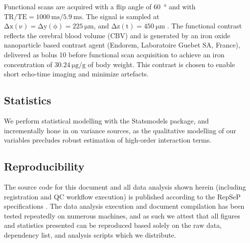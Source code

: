 Functional scans are acquired with a flip angle of \SI{60}{\degree} and with $\mathrm{TR/TE = \SI{1000}{\milli\second}/\SI{5.9}{\milli\second}}$.
The signal is sampled at $\mathrm{\Delta x(\nu)=\Delta y(\phi)=\SI{225}{\micro\meter}}$, and $\mathrm{\Delta z(t)=\SI{450}{\micro\meter}}$ .
The functional contrast reflects the cerebral blood volume (CBV) and is generated by an iron oxide nanoparticle based contrast agent (Endorem, Laboratoire Guebet SA, France), delivered as bolus \SI{10}{\minutes} before functional scan acquisition to achieve an iron concentration of $\SI{30.24}{\micro\gram\per\gram}$ of body weight.
This contrast is chosen to enable short echo-time imaging and minimize artefacts.


\subsection{Statistics}
We perform statistical modelling with the Statsmodels \cite{statsmodels} package, and incrementally hone in on variance sources, as the qualitative modelling of our variables precludes robust estimation of high-order interaction terms.


\subsection{Reproducibility}

The source code for this document and all data analysis shown herein (including registration and QC workflow execution) is published according to the RepSeP specifications \cite{repsep}.
The data analysis execution and document compilation has been tested repeatedly on numerous machines, and as such we attest that all figures and statistics presented can be reproduced based solely on the raw data, dependency list, and analysis scripts which we distribute.
